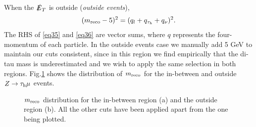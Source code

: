 When the $\slashed{E}_T$ is outside (\textit{outside events}),
\begin{equation}
	(m_{\text{reco}}-5)^{2}=(q_l+q_{\tau_\text{h}}+q_\nu)^2.
	\label{eq36}
\end{equation}
The RHS of \eqref{eq35} and \eqref{eq36} are vector sums, where $q$ represents the four-momentum of each particle. In the outside events case we manually add 5 GeV to maintain our cuts consistent, since in this region we find empirically that the di-tau mass is underestimated and we wish to apply the same selection in both regions. Fig.\ref{Fig10} shows the distribution of $m_{\text{reco}}$ for the in-between and outside $Z\to\tau_\text{h}\mu$ events. 
\begin{figure}[H]
	\centering
	\hfill
	\caption{$m_{\text{reco}}$ distribution for the in-between region (a) and the outside region (b). All the other cuts have been applied apart from the one being plotted.}
	\label{Fig10}
\end{figure}

